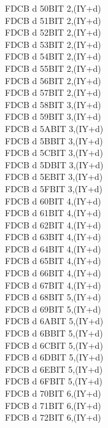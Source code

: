 \begin{multicols}{3}
{\begin{tabbing}
    FDCB d 50\>BIT 2,(IY+d)\UNDOC\\
    FDCB d 51\>BIT 2,(IY+d)\UNDOC\\
    FDCB d 52\>BIT 2,(IY+d)\UNDOC\\
    FDCB d 53\>BIT 2,(IY+d)\UNDOC\\
    FDCB d 54\>BIT 2,(IY+d)\UNDOC\\
    FDCB d 55\>BIT 2,(IY+d)\UNDOC\\
    FDCB d 56\>BIT 2,(IY+d)\\
    FDCB d 57\>BIT 2,(IY+d)\UNDOC\\
    FDCB d 58\>BIT 3,(IY+d)\UNDOC\\
    FDCB d 59\>BIT 3,(IY+d)\UNDOC\\
    FDCB d 5A\>BIT 3,(IY+d)\UNDOC\\
    FDCB d 5B\>BIT 3,(IY+d)\UNDOC\\
    FDCB d 5C\>BIT 3,(IY+d)\UNDOC\\
    FDCB d 5D\>BIT 3,(IY+d)\UNDOC\\
    FDCB d 5E\>BIT 3,(IY+d)\\
    FDCB d 5F\>BIT 3,(IY+d)\UNDOC\\
    FDCB d 60\>BIT 4,(IY+d)\UNDOC\\
    FDCB d 61\>BIT 4,(IY+d)\UNDOC\\
    FDCB d 62\>BIT 4,(IY+d)\UNDOC\\
    FDCB d 63\>BIT 4,(IY+d)\UNDOC\\
    FDCB d 64\>BIT 4,(IY+d)\UNDOC\\
    FDCB d 65\>BIT 4,(IY+d)\UNDOC\\
    FDCB d 66\>BIT 4,(IY+d)\\
    FDCB d 67\>BIT 4,(IY+d)\UNDOC\\
    FDCB d 68\>BIT 5,(IY+d)\UNDOC\\
    FDCB d 69\>BIT 5,(IY+d)\UNDOC\\
    FDCB d 6A\>BIT 5,(IY+d)\UNDOC\\
    FDCB d 6B\>BIT 5,(IY+d)\UNDOC\\
    FDCB d 6C\>BIT 5,(IY+d)\UNDOC\\
    FDCB d 6D\>BIT 5,(IY+d)\UNDOC\\
    FDCB d 6E\>BIT 5,(IY+d)\\
    FDCB d 6F\>BIT 5,(IY+d)\UNDOC\\
    FDCB d 70\>BIT 6,(IY+d)\UNDOC\\
    FDCB d 71\>BIT 6,(IY+d)\UNDOC\\
    FDCB d 72\>BIT 6,(IY+d)\UNDOC\\

\end{tabbing}}
\end{multicols}
